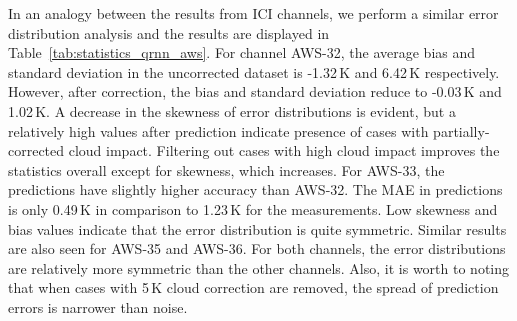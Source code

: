 \documentclass[amt, manuscript]{copernicus}
\begin{document}
In an analogy between the results from ICI channels, we perform a similar error distribution analysis  and the results are displayed in Table~\ref{tab:statistics_qrnn_aws}. For channel AWS-32, the average bias and standard deviation in the uncorrected dataset is -1.32\,K and 6.42\,K respectively. However, after correction, the bias and standard deviation reduce to -0.03\,K and 1.02\,K. A decrease in the skewness of error distributions is evident, but a relatively high values after prediction indicate presence of cases with partially-corrected cloud impact. Filtering out cases with high cloud impact improves the statistics overall except for skewness, which increases.  For AWS-33, the predictions have slightly higher accuracy than AWS-32. The MAE in predictions is only 0.49\,K in comparison to 1.23\,K for the measurements. Low skewness and bias values indicate that the error distribution is quite symmetric. Similar results are also seen for AWS-35 and AWS-36. For both channels, the error distributions are relatively more symmetric than the other channels. Also, it is worth to noting that when cases with 5\,K cloud correction are removed, the spread of prediction errors is narrower than noise. 
\end{document}

